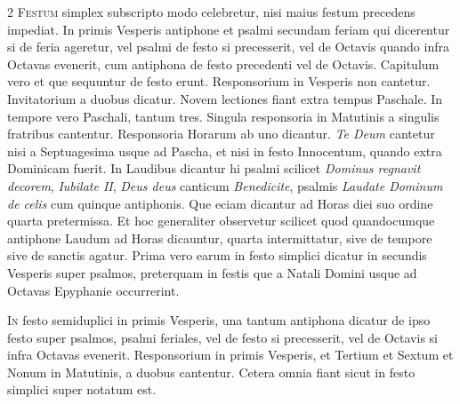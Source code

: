 \begin{multicols*}{2}
{\color{Red} }
\lettrine[lines=2]{\zallmancaps \color{Red} F}{estum} simplex subscripto modo celebretur, nisi maius festum precedens impediat. In primis Vesperis antiphone et psalmi secundam feriam qui dicerentur si de feria ageretur, vel psalmi de festo si precesserit, vel de Octavis quando infra Octavas evenerit, cum antiphona de festo precedenti vel de Octavis. Capitulum vero et que sequuntur de festo erunt. Responsorium in Vesperis non cantetur. Invitatorium a duobus dicatur. Novem lectiones fiant extra tempus Paschale. In tempore vero Paschali, tantum tres. Singula responsoria in Matutinis a singulis fratribus cantentur. Responsoria Horarum ab uno dicantur. \textit{Te Deum} cantetur nisi a Septuagesima usque ad Pascha, et nisi in festo Innocentum, quando extra Dominicam fuerit. In Laudibus dicantur hi psalmi scilicet \textit{Dominus regnavit decorem}, \textit{Iubilate II}, \textit{Deus deus} canticum \textit{Benedicite}, psalmis \textit{Laudate Dominum de celis} cum quinque antiphonis. Que eciam dicantur ad Horas diei suo ordine quarta pretermissa. Et hoc generaliter observetur scilicet quod quandocumque antiphone Laudum ad Horas dicauntur, quarta intermittatur, sive de tempore sive de sanctis agatur.
Prima vero earum in festo simplici dicatur in secundis Vesperis super psalmos, preterquam in festis que a Natali Domini usque ad Octavas Epyphanie occurrerint.

{\color{Red} }
\lettrine[lines=2]{\zallmancaps \color{Blue} I}{n} festo semiduplici in primis Vesperis, una tantum antiphona dicatur de ipso festo super psalmos, psalmi feriales, vel de festo si precesserit, vel de Octavis si infra Octavas evenerit.
Responsorium in primis Vesperis, et Tertium et Sextum et Nonum in Matutinis, a duobus cantentur. Cetera omnia fiant sicut in festo simplici super notatum est.


\end{multicols*}
